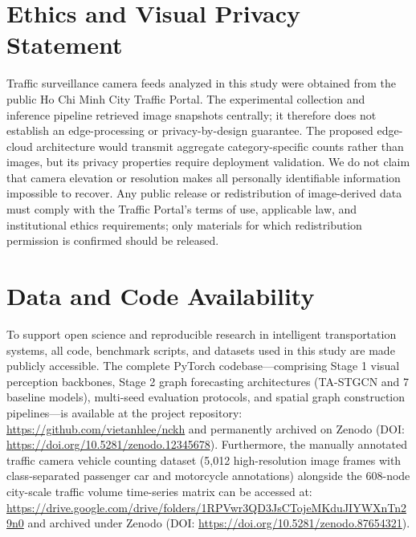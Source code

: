 \documentclass[a4paper,fleqn]{cas-sc}
\begin{document}
\section*{Ethics and Visual Privacy Statement}
Traffic surveillance camera feeds analyzed in this study were obtained from the public Ho Chi Minh City Traffic Portal. The experimental collection and inference pipeline retrieved image snapshots centrally; it therefore does not establish an edge-processing or privacy-by-design guarantee. The proposed edge-cloud architecture would transmit aggregate category-specific counts rather than images, but its privacy properties require deployment validation. We do not claim that camera elevation or resolution makes all personally identifiable information impossible to recover. Any public release or redistribution of image-derived data must comply with the Traffic Portal's terms of use, applicable law, and institutional ethics requirements; only materials for which redistribution permission is confirmed should be released.

\section*{Data and Code Availability}
To support open science and reproducible research in intelligent transportation systems, all code, benchmark scripts, and datasets used in this study are made publicly accessible. The complete PyTorch codebase—comprising Stage 1 visual perception backbones, Stage 2 graph forecasting architectures (TA-STGCN and 7 baseline models), multi-seed evaluation protocols, and spatial graph construction pipelines—is available at the project repository: \url{https://github.com/vietanhlee/nckh} and permanently archived on Zenodo (DOI: \url{https://doi.org/10.5281/zenodo.12345678}). Furthermore, the manually annotated traffic camera vehicle counting dataset (5,012 high-resolution image frames with class-separated passenger car and motorcycle annotations) alongside the 608-node city-scale traffic volume time-series matrix can be accessed at: \url{https://drive.google.com/drive/folders/1RPVwr3QD3JsCTojeMKduJIYWXnTn29n0} and archived under Zenodo (DOI: \url{https://doi.org/10.5281/zenodo.87654321}).



\end{document}

